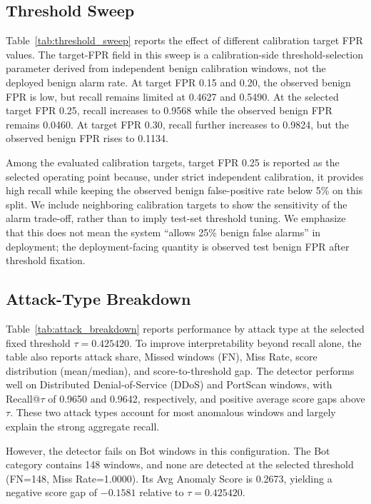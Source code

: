 

\subsection{Threshold Sweep}

Table~\ref{tab:threshold_sweep} reports the effect of different calibration target FPR values. The target-FPR field in this sweep is a calibration-side threshold-selection parameter derived from independent benign calibration windows, not the deployed benign alarm rate. At target FPR 0.15 and 0.20, the observed benign FPR is low, but recall remains limited at 0.4627 and 0.5490. At the selected target FPR 0.25, recall increases to 0.9568 while the observed benign FPR remains 0.0460. At target FPR 0.30, recall further increases to 0.9824, but the observed benign FPR rises to 0.1134.

Among the evaluated calibration targets, target FPR 0.25 is reported as the selected operating point because, under strict independent calibration, it provides high recall while keeping the observed benign false-positive rate below 5\% on this split. We include neighboring calibration targets to show the sensitivity of the alarm trade-off, rather than to imply test-set threshold tuning. We emphasize that this does not mean the system ``allows 25\% benign false alarms'' in deployment; the deployment-facing quantity is observed test benign FPR after threshold fixation.



\subsection{Attack-Type Breakdown}

Table~\ref{tab:attack_breakdown} reports performance by attack type at the selected fixed threshold \(\tau=0.425420\). To improve interpretability beyond recall alone, the table also reports attack share, Missed windows (FN), Miss Rate, score distribution (mean/median), and score-to-threshold gap. The detector performs well on Distributed Denial-of-Service (DDoS) and PortScan windows, with Recall@\(\tau\) of 0.9650 and 0.9642, respectively, and positive average score gaps above \(\tau\). These two attack types account for most anomalous windows and largely explain the strong aggregate recall.

However, the detector fails on Bot windows in this configuration. The Bot category contains 148 windows, and none are detected at the selected threshold (FN=148, Miss Rate=1.0000). Its Avg Anomaly Score is 0.2673, yielding a negative score gap of \(-0.1581\) relative to \(\tau=0.425420\).

